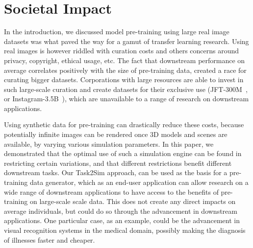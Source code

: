 \section{Societal Impact}
In the introduction, we discussed model pre-training using large real image datasets was what paved the way for a gamut of transfer learning research. Using real images is however riddled with curation costs and others concerns around privacy, copyright, ethical usage, etc. The fact that downstream performance on average correlates positively with the size of pre-training data, created a race for curating bigger datasets. Corporations with large resources are able to invest in such large-scale curation and create datasets for their exclusive use (\eg JFT-300M~\cite{chollet2017xception,hinton2015distilling}, or Instagram-3.5B~\cite{mahajan2018exploring}), which are unavailable to a range of research on downstream applications.

Using synthetic data for pre-training can drastically reduce these costs, because potentially infinite images can be rendered once 3D models and scenes are available, by varying various simulation parameters. In this paper, we demonstrated that the optimal use of such a simulation engine can be found in restricting certain variations, and that different restrictions benefit different downstream tasks. Our Task2Sim approach, can be used as the basis for a pre-training data generator, which as an end-user application can allow research on a wide range of downstream applications to have access to the benefits of pre-training on large-scale scale data. This does not create any direct impacts on average individuals, but could do so through the advancement in downstream applications. One particular case, as an example, could be the advancement in visual recognition systems in the medical domain, possibly making the diagnosis of illnesses faster and cheaper.